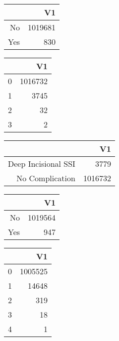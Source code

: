 \bigskip\bigskip
\centering
\begin{tabular}{rr}
  \hline
 & V1 \\ 
  \hline
No & 1019681 \\ 
  Yes & 830 \\ 
   \hline
\end{tabular}

\bigskip\bigskip
\centering
\begin{tabular}{rr}
  \hline
 & V1 \\ 
  \hline
0 & 1016732 \\ 
  1 & 3745 \\ 
  2 &  32 \\ 
  3 &   2 \\ 
   \hline
\end{tabular}

\bigskip\bigskip
\centering
\begin{tabular}{rr}
  \hline
 & V1 \\ 
  \hline
Deep Incisional SSI & 3779 \\ 
  No Complication & 1016732 \\ 
   \hline
\end{tabular}

\bigskip\bigskip
\centering
\begin{tabular}{rr}
  \hline
 & V1 \\ 
  \hline
No & 1019564 \\ 
  Yes & 947 \\ 
   \hline
\end{tabular}

\bigskip\bigskip
\centering
\begin{tabular}{rr}
  \hline
 & V1 \\ 
  \hline
0 & 1005525 \\ 
  1 & 14648 \\ 
  2 & 319 \\ 
  3 &  18 \\ 
  4 &   1 \\ 
   \hline
\end{tabular}

